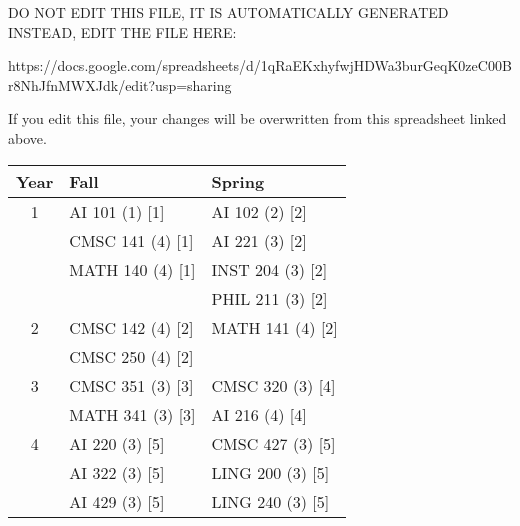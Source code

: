 
DO NOT EDIT THIS FILE, IT IS AUTOMATICALLY GENERATED
INSTEAD, EDIT THE FILE HERE:

https://docs.google.com/spreadsheets/d/1qRaEKxhyfwjHDWa3burGeqK0zeC00Br8NhJfnMWXJdk/edit?usp=sharing

If you edit this file, your changes will be overwritten from this spreadsheet
linked above.

\begin{tabular}{cll}
\toprule
Year & Fall & Spring \\
\midrule
1 & AI 101 (1) [1] & AI 102 (2) [2] \\
 & CMSC 141 (4) [1] & AI 221 (3) [2] \\
 & MATH 140 (4) [1] & INST 204 (3) [2] \\
 &  & PHIL 211 (3) [2] \\
\midrule
2 & CMSC 142 (4) [2] & MATH 141 (4) [2] \\
 & CMSC 250 (4) [2] &  \\
\midrule
3 & CMSC 351 (3) [3] & CMSC 320 (3) [4] \\
 & MATH 341 (3) [3] & AI 216 (4) [4] \\
\midrule
4 & AI 220 (3) [5] & CMSC 427 (3) [5] \\
 & AI 322 (3) [5] & LING 200 (3) [5] \\
 & AI 429 (3) [5] & LING 240 (3) [5] \\
\bottomrule
\end{tabular}